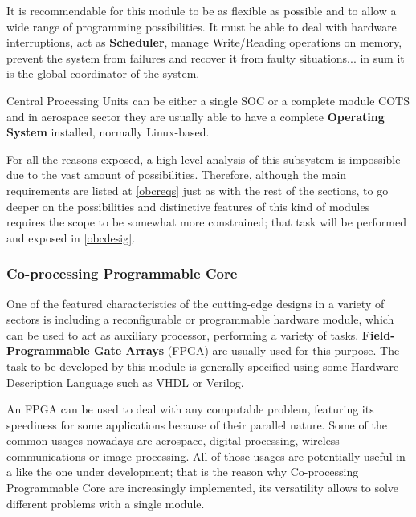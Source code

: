 It is recommendable for this module to be as flexible as possible and to allow a wide range of programming possibilities. It must be able to deal with hardware interruptions, act as \textbf{Scheduler}, manage Write/Reading operations on memory, prevent the system from failures and recover it from faulty situations... in sum it is the global coordinator of the system.

Central Processing Units can be either a single \acrshort{SOC} or a complete module \acrshort{COTS} and in aerospace sector they are usually able to have a complete \textbf{Operating System} installed, normally Linux-based. %

For all the reasons exposed, a high-level analysis of this subsystem is impossible due to the vast amount of possibilities. Therefore, although the main requirements are listed at \ref{obcreqs} just as with the rest of the sections, to go deeper on the possibilities and distinctive features of this kind of modules requires the scope to be somewhat more constrained; that task will be performed and exposed in \autoref{obcdesig}.

\subsubsection{Co-processing Programmable Core} \label{copropo}

One of the featured characteristics of the cutting-edge designs in a variety of sectors is including a reconfigurable or programmable hardware module, which can be used to act as auxiliary processor, performing a variety of tasks. \textbf{Field-Programmable Gate Arrays} (\acrshort{FPGA}) are usually used for this purpose. The task to be developed by this module is generally specified using some Hardware Description Language such as \acrshort{VHDL} or Verilog.

An \acrshort{FPGA} can be used to deal with any computable problem, featuring its speediness for some applications because of their parallel nature. Some of the common usages nowadays are aerospace, digital processing, wireless communications or image processing. All of those usages are potentially useful in a  like the one under development; that is the reason why Co-processing Programmable Core are increasingly implemented, its versatility allows to solve different problems with a single module.

